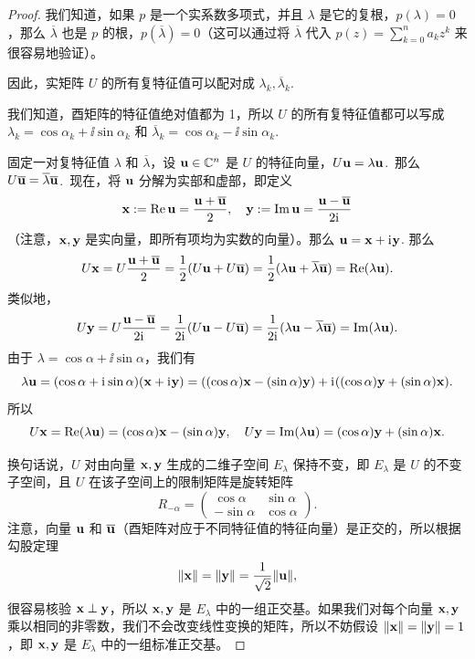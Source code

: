 \begin{proof} 我们知道，如果 $p$ 是一个实系数多项式，并且 $\lambda$ 是它的复根，$p(\lambda) = 0$，那么 $\overline{\lambda}$ 也是 $p$ 的根，$p(\overline{\lambda}) = 0$（这可以通过将 $\overline{\lambda}$ 代入 $p(z) = \sum_{k=0}^n a_k z^k$ 来很容易地验证）。

因此，实矩阵 $U$ 的所有复特征值可以配对成 $\lambda_k, \overline{\lambda}_k$.~

我们知道，酉矩阵的特征值绝对值都为 1，所以 $U$ 的所有复特征值都可以写成 $\lambda_k = \cos \alpha_k + \ii \sin \alpha_k$ 和 $\overline{\lambda}_k = \cos \alpha_k - \ii \sin \alpha_k$.~

固定一对复特征值 $\lambda$ 和 $\overline{\lambda}$，设 $\mathbf{u} \in \mathbb{C}^n$ 是 $U$ 的特征向量，$U\mathbf{u} = \lambda \mathbf{u}$.~那么 $U\overline{\mathbf{u}} = \overline{\lambda} \overline{\mathbf{u}}$.~现在，将 $\mathbf{u}$ 分解为实部和虚部，即定义
$$\mathbf{x} := \operatorname{Re} \mathbf{u} = \frac{\mathbf{u} + \overline{\mathbf{u}}}{2},\quad \mathbf{y} := \operatorname{Im} \mathbf{u} = \frac{\mathbf{u} - \overline{\mathbf{u}}}{2\mathrm{i}\mkern1mu}$$
（注意，$\mathbf{x}, \mathbf{y}$ 是实向量，即所有项均为实数的向量）。那么 $\mathbf{u} = \mathbf{x} + \mathrm{i}\mkern1mu \mathbf{y}$.
那么
$$U \mathbf{x} = U \frac{\mathbf{u} + \overline{\mathbf{u}}}{2} = \frac{1}{2}(U\mathbf{u} + U\overline{\mathbf{u}}) = \frac{1}{2}(\lambda \mathbf{u} + \overline{\lambda} \overline{\mathbf{u}}) = \operatorname{Re}(\lambda \mathbf{u}).$$
类似地，$$U \mathbf{y} = U \frac{\mathbf{u} - \overline{\mathbf{u}}}{2\mathrm{i}\mkern1mu} = \frac{1}{2\mathrm{i}\mkern1mu}(U\mathbf{u} - U\overline{\mathbf{u}}) = \frac{1}{2\mathrm{i}\mkern1mu}(\lambda \mathbf{u} - \overline{\lambda} \overline{\mathbf{u}}) = \operatorname{Im}(\lambda \mathbf{u}).$$
由于 $\lambda = \cos \alpha + \ii \sin \alpha$，我们有
$$\lambda \mathbf{u} = (\cos \alpha + \mathrm{i}\mkern1mu \sin \alpha)(\mathbf{x} + \mathrm{i}\mkern1mu \mathbf{y}) = ((\cos \alpha)\mathbf{x} - (\sin \alpha)\mathbf{y}) + \mathrm{i}\mkern1mu((\cos \alpha)\mathbf{y} + (\sin \alpha)\mathbf{x}).$$
所以 $$U \mathbf{x} = \operatorname{Re}(\lambda \mathbf{u}) = (\cos \alpha)\mathbf{x} - (\sin \alpha)\mathbf{y},\quad U \mathbf{y} = \operatorname{Im}(\lambda \mathbf{u}) = (\cos \alpha)\mathbf{y} + (\sin \alpha)\mathbf{x}.$$


换句话说，$U$ 对由向量 $\mathbf{x}, \mathbf{y}$ 生成的二维子空间 $E_\lambda$ 保持不变，即 $E_\lambda$ 是 $U$ 的不变子空间，且 $U$ 在该子空间上的限制矩阵是旋转矩阵
$$R_{-\alpha} = \begin{pmatrix} \cos \alpha & \sin \alpha \\ -\sin \alpha & \cos \alpha \end{pmatrix}.$$
注意，向量 $\mathbf{u}$ 和 $\overline{\mathbf{u}}$（酉矩阵对应于不同特征值的特征向量）是正交的，所以根据勾股定理
$$\|\mathbf{x}\| = \|\mathbf{y}\| = \frac{1}{\sqrt{2}}\|\mathbf{u}\|,$$
很容易核验 $\mathbf{x} \perp \mathbf{y}$，所以 $\mathbf{x}, \mathbf{y}$ 是 $E_\lambda$ 中的一组正交基。如果我们对每个向量 $\mathbf{x}, \mathbf{y}$ 乘以相同的非零数，我们不会改变线性变换的矩阵，所以不妨假设 $\|\mathbf{x}\| = \|\mathbf{y}\| = 1$，即 $\mathbf{x}, \mathbf{y}$ 是 $E_\lambda$ 中的一组标准正交基。


\end{proof}
